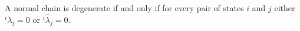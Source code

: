 A normal chain is degenerate if and only if for every pair of states $i$ and $j$ either ${}^i\lambda_j = 0$ or ${}^i\hat{\lambda}_j = 0$.
